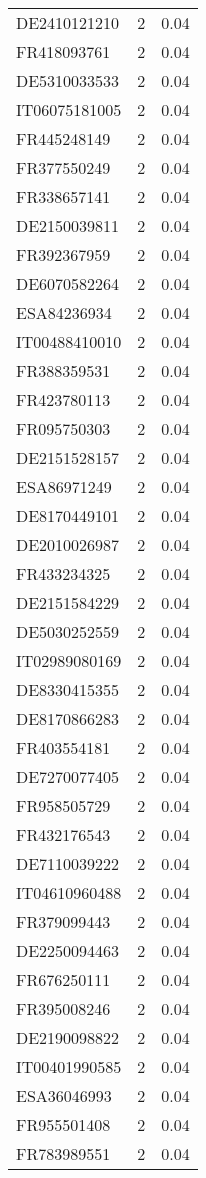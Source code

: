 \begin{table*}[htbp]
\begin{tabular}{lrr}
DE2410121210 & 2 & 0.04 \\
FR418093761 & 2 & 0.04 \\
DE5310033533 & 2 & 0.04 \\
IT06075181005 & 2 & 0.04 \\
FR445248149 & 2 & 0.04 \\
FR377550249 & 2 & 0.04 \\
FR338657141 & 2 & 0.04 \\
DE2150039811 & 2 & 0.04 \\
FR392367959 & 2 & 0.04 \\
DE6070582264 & 2 & 0.04 \\
ESA84236934 & 2 & 0.04 \\
IT00488410010 & 2 & 0.04 \\
FR388359531 & 2 & 0.04 \\
FR423780113 & 2 & 0.04 \\
FR095750303 & 2 & 0.04 \\
DE2151528157 & 2 & 0.04 \\
ESA86971249 & 2 & 0.04 \\
DE8170449101 & 2 & 0.04 \\
DE2010026987 & 2 & 0.04 \\
FR433234325 & 2 & 0.04 \\
DE2151584229 & 2 & 0.04 \\
DE5030252559 & 2 & 0.04 \\
IT02989080169 & 2 & 0.04 \\
DE8330415355 & 2 & 0.04 \\
DE8170866283 & 2 & 0.04 \\
FR403554181 & 2 & 0.04 \\
DE7270077405 & 2 & 0.04 \\
FR958505729 & 2 & 0.04 \\
FR432176543 & 2 & 0.04 \\
DE7110039222 & 2 & 0.04 \\
IT04610960488 & 2 & 0.04 \\
FR379099443 & 2 & 0.04 \\
DE2250094463 & 2 & 0.04 \\
FR676250111 & 2 & 0.04 \\
FR395008246 & 2 & 0.04 \\
DE2190098822 & 2 & 0.04 \\
IT00401990585 & 2 & 0.04 \\
ESA36046993 & 2 & 0.04 \\
FR955501408 & 2 & 0.04 \\
FR783989551 & 2 & 0.04 \\

\end{tabular}
\end{table*}

